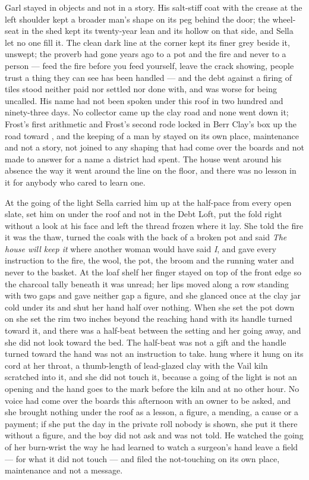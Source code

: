 Garl stayed in objects and not in a story. His salt-stiff coat with the crease at the left shoulder kept a broader man's shape on its peg behind the door; the wheel-seat in the shed kept its twenty-year lean and its hollow on that side, and Sella let no one fill it. The clean dark line at the corner kept its finer grey beside it, unswept; the proverb had gone years ago to a pot and the fire and never to a person --- feed the fire before you feed yourself, leave the crack showing, people trust a thing they can see has been handled --- and the debt against a firing of tiles stood neither paid nor settled nor done with, and was worse for being uncalled. His name had not been spoken under this roof in two hundred and ninety-three days. No collector came up the clay road and none went down it; Frost's first arithmetic and Frost's second rode locked in Berr Clay's box up the road toward , and the keeping of a man by  stayed on its own place, maintenance and not a story, not joined to any shaping that had come over the boards and not made to answer for a name a district had spent. The house went around his absence the way it went around the line on the floor, and there was no lesson in it for anybody who cared to learn one.

\scenebreak

At the going of the light Sella carried him up at the half-pace from every open slate, set him on  under the roof and not in the Debt Loft, put the fold right without a look at his face and left the thread frozen where it lay. She told the fire it was the thaw, turned the coals with the back of a broken pot and said \emph{The house will keep it} where another woman would have said \emph{I}, and gave every instruction to the fire, the wool, the pot, the broom and the running water and never to the basket. At the loaf shelf her finger stayed on top of the front edge so the charcoal tally beneath it was unread; her lips moved along a row standing with two gaps and gave neither gap a figure, and she glanced once at the clay jar cold under its  and shut her hand half over nothing. When she set the pot down on  she set the rim two inches beyond the reaching hand with its handle turned toward it, and there was a half-beat between the setting and her going away, and she did not look toward the bed. The half-beat was not a gift and the handle turned toward the hand was not an instruction to take.  hung where it hung on its cord at her throat, a thumb-length of lead-glazed clay with the Vail kiln scratched into it, and she did not touch it, because a going of the light is not an opening and the hand goes to the mark before the kiln and at no other hour. No voice had come over the boards this afternoon with an owner to be asked, and she brought nothing under the roof as a lesson, a figure, a mending, a cause or a payment; if she put the day in the private roll nobody is shown, she put it there without a figure, and the boy did not ask and was not told. He watched the going of her burn-wrist the way he had learned to watch a surgeon's hand leave a field --- for what it did not touch --- and filed the not-touching on its own place, maintenance and not a message.


